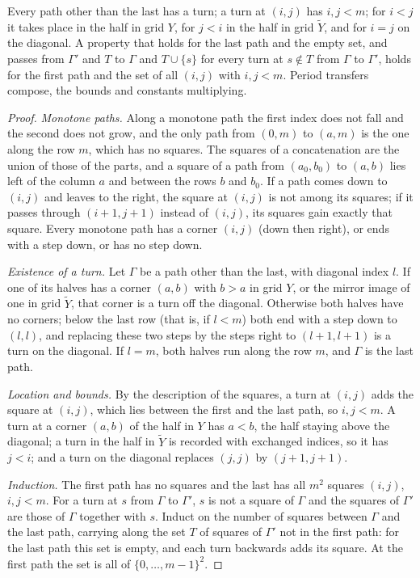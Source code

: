 \begin{lemma}\label{lem:paths}
Every path other than the last has a turn; a turn at $(i,j)$ has $i,j<m$; for $i<j$ it takes place in the half in grid $Y$, for $j<i$ in the half in grid $\tilde Y$, and for $i=j$ on the diagonal. A
property that holds for the last path and the empty set, and passes from $\Gamma'$ and $T$ to $\Gamma$ and $T\cup\{s\}$ for every turn at $s\notin T$ from $\Gamma$ to $\Gamma'$, holds for the first path and the set of
all $(i,j)$ with $i,j<m$. Period transfers compose, the bounds and constants multiplying.
\end{lemma}

\begin{proof}
\emph{Monotone paths.} Along a monotone path the first index does not fall and the second does not grow, and the only path from $(0,m)$ to $(a,m)$ is the one along the row $m$, which has no squares. The squares
of a concatenation are the union of those of the parts, and a square of a path from $(a_0,b_0)$ to $(a,b)$ lies left of the column $a$ and between the rows $b$ and $b_0$. If a path comes down to $(i,j)$ and leaves
to the right, the square at $(i,j)$ is not among its squares; if it passes through $(i+1,j+1)$ instead of $(i,j)$, its squares gain exactly that square. Every monotone path has a corner $(i,j)$ (down then right),
or ends with a step down, or has no step down.

\emph{Existence of a turn.} Let $\Gamma$ be a path other than the last, with diagonal index $l$. If one of its halves has a corner $(a,b)$ with $b>a$ in grid $Y$, or the mirror image of one in grid $\tilde Y$, that corner
is a turn off the diagonal. Otherwise both halves have no corners; below the last row (that is, if $l<m$) both end with a step down to $(l,l)$, and replacing these two steps by the steps right to $(l+1,l+1)$ is a
turn on the diagonal. If $l=m$, both halves run along the row $m$, and $\Gamma$ is the last path.

\emph{Location and bounds.} By the description of the squares, a turn at $(i,j)$ adds the square at $(i,j)$, which lies between the first and the last path, so $i,j<m$. A turn at a corner $(a,b)$ of the half in $Y$
has $a<b$, the half staying above the diagonal; a turn in the half in $\tilde Y$ is recorded with exchanged indices, so it has $j<i$; and a turn on the diagonal replaces $(j,j)$ by $(j+1,j+1)$.

\emph{Induction.} The first path has no squares and the last has all $m^2$ squares $(i,j)$, $i,j<m$. For a turn at $s$ from $\Gamma$ to $\Gamma'$, $s$ is not a square of $\Gamma$ and the squares of $\Gamma'$ are those of $\Gamma$
together with $s$. Induct on the number of squares between $\Gamma$ and the last path, carrying along the set $T$ of squares of $\Gamma'$ not in the first path: for the last path this set is empty, and each turn
backwards adds its square. At the first path the set is all of $\{0,\dots,m-1\}^2$.


\end{proof}
